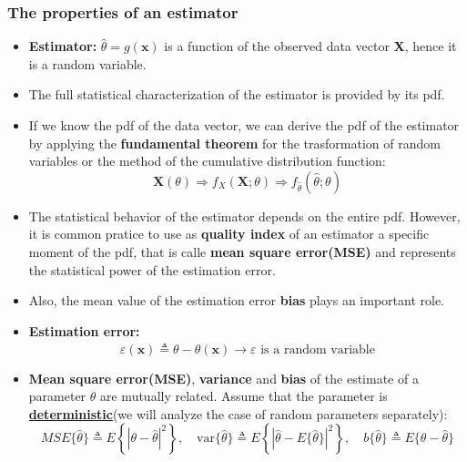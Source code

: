 \subsubsection{The properties of an estimator}
\begin{itemize}
    \item \textbf{Estimator:} \(\hat{\theta}=g(\textbf{x})\) is a function of the observed data vector \textbf{X}, hence it is a random variable.
    \item The full statistical characterization of the estimator is provided by its pdf.
    \item If we know the pdf of the data vector, we can derive the pdf of the estimator by applying the \textbf{fundamental theorem} for the trasformation of random variables or the method of the cumulative distribution function:
    \[
    \mathbf{X}(\theta)\Rightarrow f_X(\mathbf{X};\theta)\Rightarrow f_{\hat{\theta}}(\hat{\theta};\theta)
    \]
    \item The statistical behavior of the estimator depends on the entire pdf. However, it is common pratice to use as \textbf{quality index} of an estimator a specific moment of the pdf, that is calle \textbf{mean square error(MSE)} and represents the statistical power of the estimation error.
    \item Also, the mean value of the estimation error \textbf{bias} plays an important role.
    \item \textbf{Estimation error:}
    \[
    \varepsilon(\mathbf{x})\triangleq \theta-\hat{\theta}(\textbf{x})\longrightarrow \varepsilon\text{ is a random variable}
    \]
    \item \textbf{Mean square error(MSE)}, \textbf{variance} and \textbf{bias} of the estimate of a parameter \(\theta\) are mutually related. Assume that the parameter is \textbf{\underline{deterministic}}(we will analyze the case of random parameters separately):
    \[
MSE\{ \hat{\theta} \} \triangleq E \left\{ \left| \theta - \hat{\theta} \right|^2 \right\}, \quad
\text{var} \{ \hat{\theta} \} \triangleq E \left\{ \left| \hat{\theta} - E\{\hat{\theta}\} \right|^2 \right\}, \quad
b\{\hat{\theta}\} \triangleq E\{\theta - \hat{\theta}\}
\]


\end{itemize}
